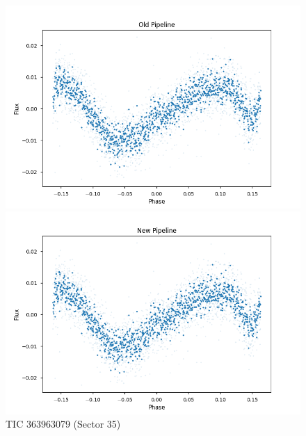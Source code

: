 \documentclass{article}
\begin{document}
\begin{figure}[h!]
    \centering
    \begin{minipage}{0.45\textwidth}
        \centering
        \includegraphics[width=\textwidth]{./figures/4_old.png}
    \end{minipage}%
    \hfill
    \begin{minipage}{0.45\textwidth}
        \centering
        \includegraphics[width=\textwidth]{./figures/4_new.png}
    \end{minipage}
    \caption{TIC 363963079 (Sector 35)}
\end{figure}
\end{document}
